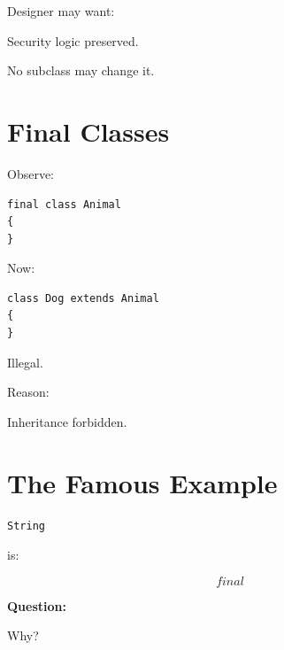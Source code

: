 \documentclass[11pt,a4paper]{book}
\begin{document}

Designer may want:


Security logic preserved.


No subclass may change it.


\section{Final Classes}

Observe:

\begin{verbatim}
final class Animal
{
}
\end{verbatim}


Now:

\begin{verbatim}
class Dog extends Animal
{
}
\end{verbatim}


Illegal.


Reason:

Inheritance forbidden.


\section{The Famous Example}

\begin{verbatim}
String
\end{verbatim}


is:

\[
final
\]


\textbf{Question:}

Why?
\end{document}
